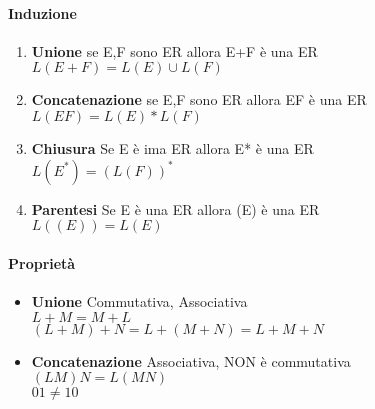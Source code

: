 \paragraph*{Induzione}
\begin{enumerate}
    \item \textbf{Unione} \ra se E,F sono ER allora E+F è una ER \\
    $L(E+F) = L(E)\cup L(F)$
    \item \textbf{Concatenazione} \ra se E,F sono ER allora EF è una ER \\
    $L(EF) = L(E)*L(F)$
    \item \textbf{Chiusura} \ra Se E è ima ER allora E* è una ER \\
    $L(E^*) = (L(F))^*$
    \item \textbf{Parentesi} \ra Se E è una ER allora (E) è una ER \\
    $L((E)) = L(E)$
\end{enumerate}
\paragraph*{Proprietà}
\begin{itemize}
    \item \textbf{Unione} \ra Commutativa, Associativa \\
    $L+M = M+L$ \\ $(L+M)+N = L+(M+N) = L+M+N$
    \item \textbf{Concatenazione} \ra Associativa, NON è commutativa \\
    $(LM)N=L(MN)$ \\ $01 \neq 10$
\end{itemize}
